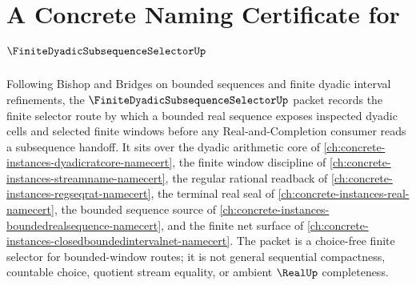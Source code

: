 \chapter{A Concrete Naming Certificate for $\FiniteDyadicSubsequenceSelectorUp$}
\label{ch:concrete-instances-finite-dyadic-subsequence-selector-namecert}

Following Bishop and Bridges on bounded sequences and finite dyadic interval refinements, the $\FiniteDyadicSubsequenceSelectorUp$ packet records the finite selector route by which a bounded real sequence exposes inspected dyadic cells and selected finite windows before any Real-and-Completion consumer reads a subsequence handoff. It sits over the dyadic arithmetic core of \autoref{ch:concrete-instances-dyadicratcore-namecert}, the finite window discipline of \autoref{ch:concrete-instances-streamname-namecert}, the regular rational readback of \autoref{ch:concrete-instances-regseqrat-namecert}, the terminal real seal of \autoref{ch:concrete-instances-real-namecert}, the bounded sequence source of \autoref{ch:concrete-instances-boundedrealsequence-namecert}, and the finite net surface of \autoref{ch:concrete-instances-closedboundedintervalnet-namecert}. The packet is a choice-free finite selector for bounded-window routes; it is not general sequential compactness, countable choice, quotient stream equality, or ambient $\RealUp$ completeness.

